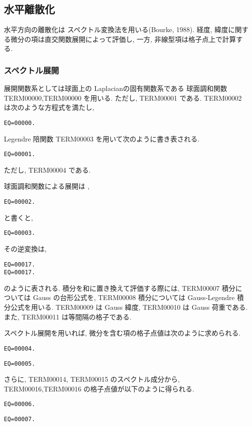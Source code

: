 ﻿\subsection{水平離散化}

水平方向の離散化は
スペクトル変換法を用いる(Bourke, 1988).
経度, 緯度に関する微分の項は直交関数展開によって評価し,
一方, 非線型項は格子点上で計算する.

\subsubsection{スペクトル展開}

展開関数系としては球面上の Laplacianの固有関数系である
球面調和関数 TERM00000,TERM00000 を用いる.
ただし, TERM00001 である.
TERM00002 は次のような方程式を満たし,
%
\begin{verbatim}
EQ=00000.
\end{verbatim}
%
Legendre 陪関数 TERM00003 を用いて次のように書き表される.
%
\begin{verbatim}
EQ=00001.
\end{verbatim}
%
ただし, TERM00004 である.

球面調和関数による展開は \footnotemark ,
\begin{verbatim}
EQ=00002.
\end{verbatim}
と書くと,
%
%
\begin{verbatim}
EQ=00003.
\end{verbatim}
%
その逆変換は,
\begin{verbatim}
EQ=00017.
EQ=00017.
\end{verbatim}
%
のように表される.
%
積分を和に置き換えて評価する際には,
TERM00007 積分については Gauss の台形公式を,
TERM00008 積分については Gauss-Legendre 積分公式を用いる.
TERM00009 は Gauss 緯度, TERM00010 は Gauss 荷重である.
また, TERM00011 は等間隔の格子である.

スペクトル展開を用いれば,
微分を含む項の格子点値は次のように求められる.
%
\begin{verbatim}
EQ=00004.
\end{verbatim}
%
\begin{verbatim}
EQ=00005.
\end{verbatim}
%
さらに,
TERM00014, TERM00015 のスペクトル成分から, 
TERM00016,TERM00016 の格子点値が以下のように得られる.
%
\begin{verbatim}
EQ=00006.
\end{verbatim}
%
\begin{verbatim}
EQ=00007.
\end{verbatim}

